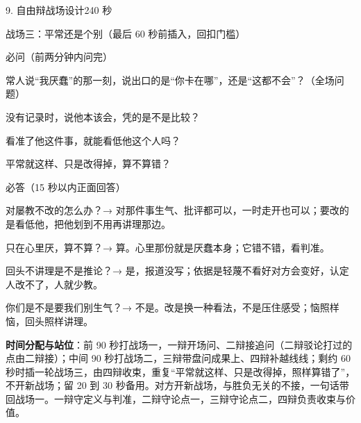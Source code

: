 \documentclass[script,pro]{debate}
\begin{document}
\begin{stage}{9. 自由辩战场设计}{240 秒}
\begin{battleground}{战场三：平常还是个别（最后 60 秒前插入，回扣门槛）}
\begin{fields}
\end{fields}
\end{battleground}
\begin{points}{必问（前两分钟内问完）}
\item 常人说“我厌蠢”的那一刻，说出口的是“你卡在哪”，还是“这都不会”？（全场问题）
\item 没有记录时，说他本该会，凭的是不是比较？
\item 看准了他这件事，就能看低他这个人吗？
\item 平常就这样、只是改得掉，算不算错？
\end{points}
\begin{points}{必答（15 秒以内正面回答）}
\item 对屡教不改的怎么办？→ 对那件事生气、批评都可以，一时走开也可以；要改的是看低他，把他划到不用再讲理那边。
\item 只在心里厌，算不算？→ 算。心里那份就是厌蠢本身；它错不错，看判准。
\item 回头不讲理是不是推论？→ 是，报道没写；依据是轻蔑不看好对方会变好，认定人改不了，人就少教。
\item 你们是不是要我们别生气？→ 不是。改是换一种看法，不是压住感受；恼照样恼，回头照样讲理。
\end{points}
\textbf{时间分配与站位}：前 90 秒打战场一，一辩开场问、二辩接追问（二辩驳论打过的点由二辩接）；中间 90 秒打战场二，三辩带盘问成果上、四辩补越线线；剩约 60 秒时插一轮战场三，由四辩收束，重复“平常就这样、只是改得掉，照样算错了”，不开新战场；留 20 到 30 秒备用。对方开新战场，与胜负无关的不接，一句话带回战场一。一辩守定义与判准，二辩守论点一，三辩守论点二，四辩负责收束与价值。
\end{stage}
\end{document}
